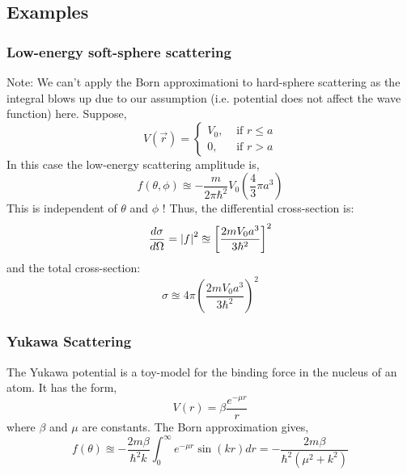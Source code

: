 \subsection{Examples}
\subsubsection{Low-energy soft-sphere scattering}
Note: We can't apply the Born approximationi to hard-sphere scattering as the integral blows up due to our assumption (i.e. potential does not affect the wave function) here. Suppose,
\begin{equation}
	V(\vec{r}) = \begin{cases}
		V_{0}, & \text{ if } r \leq a \\
		0, & \text{ if } r > a
	\end{cases}
\end{equation}
In this case the low-energy scattering amplitude is,
\begin{equation}
	f(\theta, \phi) \approxeq -\frac{m}{2 \pi \hbar^{2}}V_{0}\left(\frac{4}{3} \pi a^{3} \right)
\end{equation}
This is independent of $\theta$ and $\phi$ ! Thus, the differential cross-section is:
\begin{equation}
\frac{d \sigma}{d \Omega} = \abs{f}^{2}  \approxeq \left[\frac{2m V_{0} a^{3}}{3 \hbar^{2}} \right]^{2}
\end{equation}
and the total cross-section:
\begin{equation}
\sigma 	\approxeq 4 \pi \left(\frac{2m V_{0} a^{3}}{3 \hbar^{2}}\right)^{2}
\end{equation}
\subsubsection{Yukawa Scattering}
The Yukawa potential is a toy-model for the binding force in the nucleus of an atom. It has the form,
\begin{equation}
V(r) = \beta \frac{e^{-\mu r}}{r}
\end{equation}
where $\beta$ and $\mu$ are constants. The Born approximation gives,
\begin{equation}
f(\theta) \approxeq -\frac{2m \beta}{\hbar^{2}k} \int_{0}^{\infty} e^{- \mu r} \sin(kr) dr = - \frac{2m \beta}{\hbar^{2} (\mu^{2} + k^{2})}
\end{equation}
